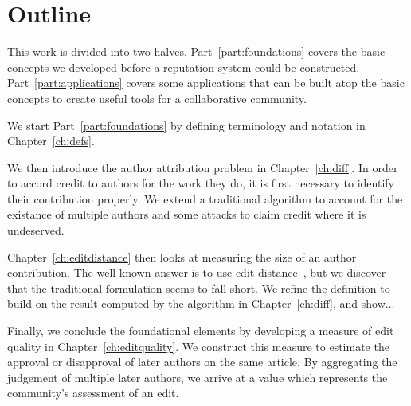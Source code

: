 \section{Outline}

This work is divided into two halves.
Part~\ref{part:foundations} covers the basic concepts we developed
before a reputation system could be constructed.
Part~\ref{part:applications} covers some applications that can
be built atop the basic concepts to create useful tools for
a collaborative community.

We start Part~\ref{part:foundations}
by defining terminology and notation in Chapter~\ref{ch:defs}.

We then introduce the author attribution problem in Chapter~\ref{ch:diff}.
In order to accord credit to authors for the work they do,
it is first necessary to identify their contribution properly.
We extend a traditional  algorithm to
account for the existance of multiple authors and some attacks
to claim credit where it is undeserved.

Chapter~\ref{ch:editdistance} then looks at measuring the size of
an author contribution.
The well-known answer is to use edit distance~\cite{Levenshtein66},
but we discover that the traditional formulation seems to fall short.
We refine the definition to build on the result computed by the
algorithm in Chapter~\ref{ch:diff}, and show...

Finally, we conclude the foundational elements by developing a measure
of edit quality in Chapter~\ref{ch:editquality}.
We construct this measure to estimate the approval or disapproval of
later authors on the same article.
By aggregating the judgement of multiple later authors, we arrive at
a value which represents the community's assessment of an edit.


